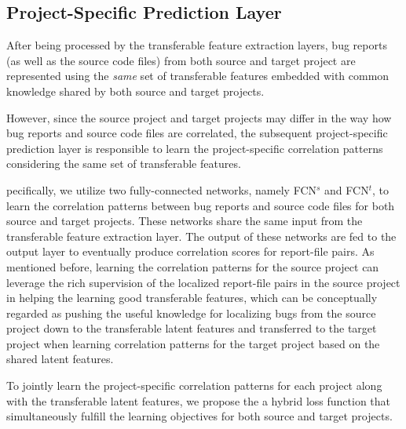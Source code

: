 
\subsection{Project-Specific Prediction Layer} %

After being processed by the transferable feature extraction layers, bug reports (as well as the source code files) from both source and target project are represented using the \emph{same} set of transferable features embedded with common knowledge shared by both source and target projects.


However, since the source project and target projects may differ in the way how bug reports and source code files are correlated, the subsequent project-specific prediction layer is responsible to learn the project-specific correlation patterns considering the same set of transferable features.

pecifically, we utilize two fully-connected networks, namely FCN$^s$ and FCN$^t$, to learn the correlation patterns between bug reports and source code files for both source and target projects. These networks share the same input from the transferable feature extraction layer. The output of these networks are fed to the output layer to eventually produce correlation scores for report-file pairs. As mentioned before, learning the correlation patterns for the source project can leverage the rich supervision of the localized report-file pairs in the source project in helping the learning good transferable features, which can be conceptually regarded as pushing the useful knowledge for localizing bugs from the source project down to the transferable latent features and transferred to the target project when learning correlation patterns for the target project based on the shared latent features. 


To jointly learn the project-specific correlation patterns for each project along with the transferable latent features, we propose the a hybrid loss function that simultaneously fulfill the learning objectives for both source and target projects. 

